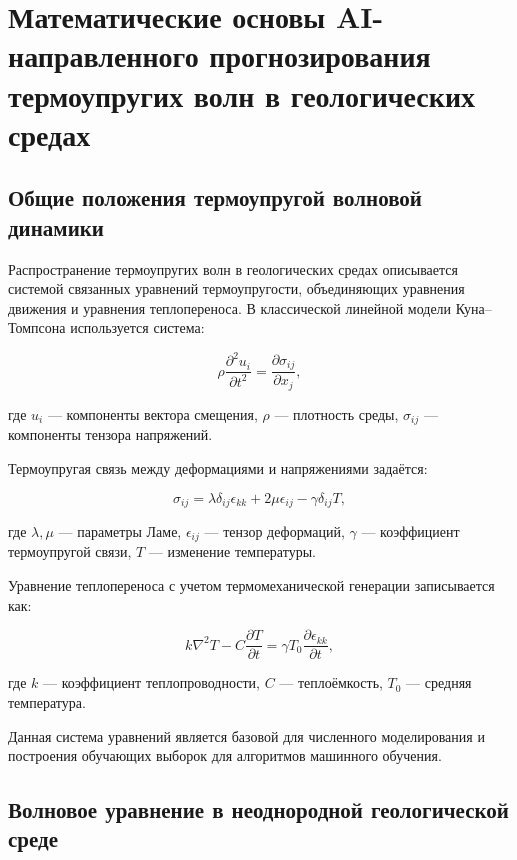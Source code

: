 \section{Математические основы AI-направленного прогнозирования термоупругих волн в геологических средах}

\subsection{Общие положения термоупругой волновой динамики}

Распространение термоупругих волн в геологических средах описывается системой связанных уравнений термоупругости, объединяющих уравнения движения и уравнения теплопереноса. В классической линейной модели Куна–Томпсона используется система:

\begin{equation}
\rho \frac{\partial^2 u_i}{\partial t^2} = \frac{\partial \sigma_{ij}}{\partial x_j},
\label{eq:motion}
\end{equation}

где $u_i$ — компоненты вектора смещения, $\rho$ — плотность среды, $\sigma_{ij}$ — компоненты тензора напряжений.

Термоупругая связь между деформациями и напряжениями задаётся:

\begin{equation}
\sigma_{ij} = \lambda \delta_{ij} \epsilon_{kk} + 2\mu \epsilon_{ij} - \gamma \delta_{ij} T,
\label{eq:stress}
\end{equation}

где $\lambda, \mu$ — параметры Ламе, $\epsilon_{ij}$ — тензор деформаций, $\gamma$ — коэффициент термоупругой связи, $T$ — изменение температуры.

Уравнение теплопереноса с учетом термомеханической генерации записывается как:

\begin{equation}
k \nabla^2 T - C \frac{\partial T}{\partial t} = \gamma T_0 \frac{\partial \epsilon_{kk}}{\partial t},
\label{eq:heat}
\end{equation}

где $k$ — коэффициент теплопроводности, $C$ — теплоёмкость, $T_0$ — средняя температура.

Данная система уравнений является базовой для численного моделирования и построения обучающих выборок для алгоритмов машинного обучения.

\subsection{Волновое уравнение в неоднородной геологической среде}

